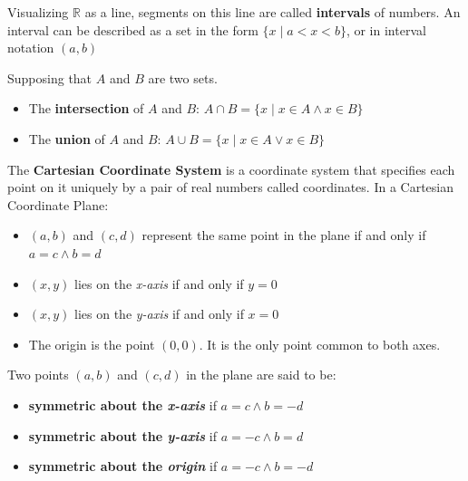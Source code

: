 \begin{definition}[Intervals]
    Visualizing $\mathbb{R}$ as a line, segments on this line are called \textbf{intervals} of numbers.
    An interval can be described as a set in the form $\{x \mid a < x < b\}$, or in interval notation $(a, b)$
\end{definition}

\begin{definition}
    Supposing that $A$ and $B$ are two sets.
    \begin{itemize}
        \item The \textbf{intersection} of $A$ and $B$: $A \cap B = \{x \mid x \in A \land x \in B\}$
        \item The \textbf{union} of $A$ and $B$: $A \cup B = \{x \mid x \in A \lor x \in B\}$
    \end{itemize}
\end{definition}

\begin{definition}
    The \textbf{Cartesian Coordinate System} is a coordinate system that specifies each point on it uniquely by a pair of real numbers called coordinates. In a Cartesian Coordinate Plane:
    \begin{itemize}
        \item $(a, b)$ and $(c, d)$ represent the same point in the plane if and only if $a = c \land b = d$
        \item $(x, y)$ lies on the \textit{x-axis} if and only if $y = 0$
        \item $(x, y)$ lies on the \textit{y-axis} if and only if $x = 0$
        \item The origin is the point $(0,0)$. It is the only point common to both axes.
    \end{itemize}
\end{definition}

\begin{definition}[Symmmetry]
    Two points $(a, b)$ and $(c,d)$ in the plane are said to be:
    \begin{itemize}
        \item \textbf{symmetric about the \textit{x-axis}} if $a=c \land b = -d$
        \item \textbf{symmetric about the \textit{y-axis}} if $a=-c \land b = d$
        \item \textbf{symmetric about the \textit{origin}} if $a= -c \land b = -d$
    \end{itemize}
\end{definition}

